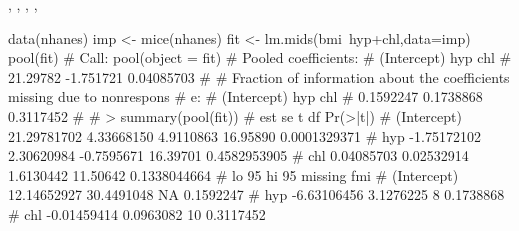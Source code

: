 \documentclass{article}
\begin{document}
\begin{SeeAlso}\relax
{}, , ,
, 
\end{SeeAlso}
\begin{Examples}
\begin{ExampleCode}
data(nhanes)
imp <- mice(nhanes)
fit <- lm.mids(bmi~hyp+chl,data=imp)
pool(fit)
#  Call: pool(object = fit)
#  Pooled coefficients:
#   (Intercept)       hyp        chl 
#      21.29782 -1.751721 0.04085703
#
#  Fraction of information about the coefficients missing due to nonrespons
#  e: 
#   (Intercept)       hyp       chl 
#     0.1592247 0.1738868 0.3117452
#
#  > summary(pool(fit))
#           est         se          t       df     Pr(>|t|) 
#  (Intercept)  21.29781702 4.33668150  4.9110863 16.95890 0.0001329371
#      hyp  -1.75172102 2.30620984 -0.7595671 16.39701 0.4582953905
#      chl   0.04085703 0.02532914  1.6130442 11.50642 0.1338044664
#             lo 95      hi 95 missing       fmi 
#  (Intercept)  12.14652927 30.4491048      NA 0.1592247
#      hyp  -6.63106456  3.1276225       8 0.1738868
#    chl  -0.01459414  0.0963082      10 0.3117452 
\end{ExampleCode}
\end{Examples}
\end{document}
